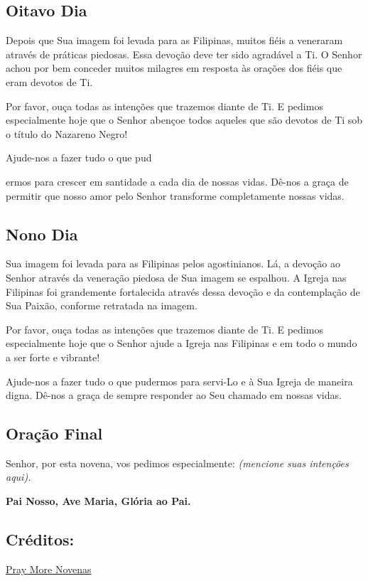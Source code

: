\documentclass[18pt]{article}
\begin{document}
\subsection{Oitavo Dia}
\textbf{}




Depois que Sua imagem foi levada para as Filipinas, muitos fiéis a veneraram através de práticas piedosas. Essa devoção deve ter sido agradável a Ti. O Senhor achou por bem conceder muitos milagres em resposta às orações dos fiéis que eram devotos de Ti.

Por favor, ouça todas as intenções que trazemos diante de Ti. E pedimos especialmente hoje que o Senhor abençoe todos aqueles que são devotos de Ti sob o título do Nazareno Negro!

Ajude-nos a fazer tudo o que pud

ermos para crescer em santidade a cada dia de nossas vidas. Dê-nos a graça de permitir que nosso amor pelo Senhor transforme completamente nossas vidas.

\textbf{}

\subsection{Nono Dia}
\textbf{}


Sua imagem foi levada para as Filipinas pelos agostinianos. Lá, a devoção ao Senhor através da veneração piedosa de Sua imagem se espalhou. A Igreja nas Filipinas foi grandemente fortalecida através dessa devoção e da contemplação de Sua Paixão, conforme retratada na imagem.

Por favor, ouça todas as intenções que trazemos diante de Ti. E pedimos especialmente hoje que o Senhor ajude a Igreja nas Filipinas e em todo o mundo a ser forte e vibrante!

Ajude-nos a fazer tudo o que pudermos para servi-Lo e à Sua Igreja de maneira digna. Dê-nos a graça de sempre responder ao Seu chamado em nossas vidas.



\subsection{Oração Final}\label{sec:Oração_Final} %
Senhor, por esta novena, vos pedimos especialmente: \textit{(mencione suas intenções aqui).}

\textbf{Pai Nosso, Ave Maria, Glória ao Pai.}

\subsection*{Créditos:}
\href{https://www.praymorenovenas.com/black-nazarene-novena}{Pray More Novenas}
\end{document}
